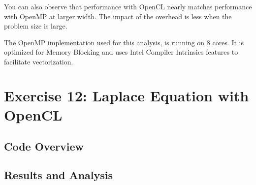\documentclass[]{scrartcl}
\begin{document}
You can also observe that performance with OpenCL nearly matches performance with OpenMP at larger width. The impact of the overhead
is less when the problem size is large.

The OpenMP implementation used for this analysis, is running on 8 cores. It is optimized for Memory Blocking and uses Intel
Compiler Intrinsics features to facilitate vectorization.

\pagebreak
\section{Exercise 12: Laplace Equation with OpenCL}

\subsection{Code Overview}

\subsection{Results and Analysis}
\end{document}
